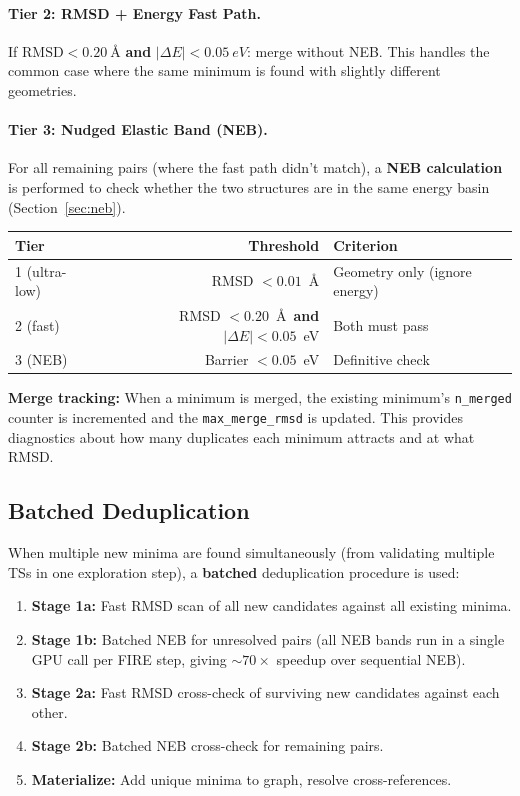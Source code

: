 \documentclass[11pt,a4paper]{article}
\begin{document}
\paragraph{Tier 2: RMSD + Energy Fast Path.}
If $\text{RMSD} < \SI{0.20}{\angstrom}$ \textbf{and} $|\Delta E| < \SI{0.05}{eV}$: merge without NEB. This handles the common case where the same minimum is found with slightly different geometries.

\paragraph{Tier 3: Nudged Elastic Band (NEB).}
For all remaining pairs (where the fast path didn't match), a \textbf{NEB calculation} is performed to check whether the two structures are in the same energy basin (Section~\ref{sec:neb}).

\begin{threshbox}
\begin{tabular}{lrl}
\toprule
Tier & Threshold & Criterion \\
\midrule
1 (ultra-low) & RMSD $< 0.01$~\AA & Geometry only (ignore energy) \\
2 (fast) & RMSD $< 0.20$~\AA\ \textbf{and} $|\Delta E| < 0.05$~eV & Both must pass \\
3 (NEB) & Barrier $< 0.05$~eV & Definitive check \\
\bottomrule
\end{tabular}
\end{threshbox}

\textbf{Merge tracking:} When a minimum is merged, the existing minimum's \texttt{n\_merged} counter is incremented and the \texttt{max\_merge\_rmsd} is updated. This provides diagnostics about how many duplicates each minimum attracts and at what RMSD.

\subsection{Batched Deduplication}

When multiple new minima are found simultaneously (from validating multiple TSs in one exploration step), a \textbf{batched} deduplication procedure is used:

\begin{enumerate}
    \item \textbf{Stage 1a:} Fast RMSD scan of all new candidates against all existing minima.
    \item \textbf{Stage 1b:} Batched NEB for unresolved pairs (all NEB bands run in a single GPU call per FIRE step, giving $\sim$$70\times$ speedup over sequential NEB).
    \item \textbf{Stage 2a:} Fast RMSD cross-check of surviving new candidates against each other.
    \item \textbf{Stage 2b:} Batched NEB cross-check for remaining pairs.
    \item \textbf{Materialize:} Add unique minima to graph, resolve cross-references.
\end{enumerate}
\end{document}
